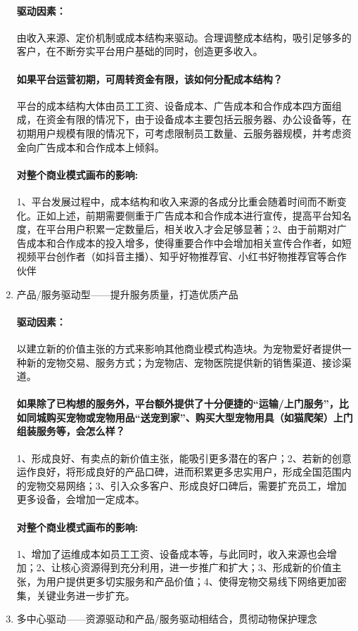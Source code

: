 \documentclass[a4paper]{ctexart}
\begin{document}
\begin{enumerate}[label=\alph*.]
  \paragraph{驱动因素：}由收入来源、定价机制或成本结构来驱动。合理调整成本结构，吸引足够多的客户，在不断夯实平台用户基础的同时，创造更多收入。
  \paragraph{如果平台运营初期，可周转资金有限，该如何分配成本结构？}平台的成本结构大体由员工工资、设备成本、广告成本和合作成本四方面组成，在资金有限的情况下，由于设备成本主要包括云服务器、办公设备等，在初期用户规模有限的情况下，可考虑限制员工数量、云服务器规模，并考虑资金向广告成本和合作成本上倾斜。
  \paragraph{对整个商业模式画布的影响:}1、平台发展过程中，成本结构和收入来源的各成分比重会随着时间而不断变化。正如上述，前期需要侧重于广告成本和合作成本进行宣传，提高平台知名度，在平台用户积累一定数量后，相关收入才会足够显著；2、由于前期对广告成本和合作成本的投入增多，使得重要合作中会增加相关宣传合作者，如短视频平台创作者（如抖音主播）、知乎好物推荐官、小红书好物推荐官等合作伙伴
  \item 产品/服务驱动型——提升服务质量，打造优质产品 
  \paragraph{驱动因素：}以建立新的价值主张的方式来影响其他商业模式构造块。为宠物爱好者提供一种新的宠物交易、服务方式；为宠物店、宠物医院提供新的销售渠道、接诊渠道。
  \paragraph{如果除了已构想的服务外，平台额外提供了十分便捷的“运输/上门服务”，比如同城购买宠物或宠物用品“送宠到家”、购买大型宠物用具（如猫爬架）上门组装服务等，会怎么样？}1、形成良好、有卖点的新价值主张，能吸引更多潜在的客户；2、若新的创意运作良好，将形成良好的产品口碑，进而积累更多忠实用户，形成全国范围内的宠物交易网络；3、引入众多客户、形成良好口碑后，需要扩充员工，增加更多设备，会增加一定成本。
  \paragraph{对整个商业模式画布的影响:}1、增加了运维成本如员工工资、设备成本等，与此同时，收入来源也会增加；2、让核心资源得到充分利用，进一步推广和扩大；3、形成新的价值主张，为用户提供更多切实服务和产品价值；4、使得宠物交易线下网络更加密集，关键业务进一步扩充。
  \item 多中心驱动——资源驱动和产品/服务驱动相结合，贯彻动物保护理念 

\end{enumerate}
\end{document}
